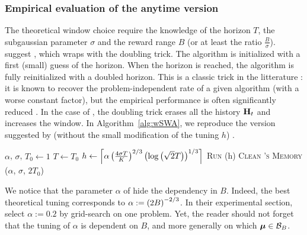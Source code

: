\subsubsection*{Empirical evaluation of the anytime version {\wSWA}}
The theoretical window choice require the knowledge of the horizon $T$, the subgaussian parameter $\sigma$ and the reward range $B$ (or at least the ratio $\frac{B}{\sigma}$). \citet{levine2017rotting} suggest \wSWA, which wraps \SWA  with the doubling trick. The algorithm is initialized with a first (small) guess of the horizon. When the horizon is reached, the algorithm is fully reinitialized with a doubled horizon. This is a classic trick in the litterature : it is known to recover the problem-independent rate of a given algorithm (with a worse constant factor), but the empirical performance is often significantly reduced \citep{besson2018}. In the case of \wSWA, the doubling trick erases all the history $\mathbf{H}_t$ and increases the window. In Algorithm~\ref{alg:wSWA}, we reproduce the version suggested by \citet{levine2017rotting} (without the small modification of the tuning $h$) . 

\begin{minipage}{\textwidth}
\renewcommand*\footnoterule{}
\begin{savenotes}
\begin{algorithm}[H]
\caption{\wSWA \citep{levine2017rotting} }
\label{alg:wSWA}
\begin{algorithmic}[1]
\Require $\alpha$, $\sigma$, $T_0 \gets 1$
\State $T \gets T_0$
\State $h \gets \left\lceil\alpha\left(\frac{4\sigma T}{K}\right)^{2/3}\left(\log\left(\sqrt{2}T\right)\right)^{1/3}\right\rceil$
		\State \textsc{Run} \SWA(h)
	\EndFor
\State \textsc{Clean \SWA's \textsc{Memory}}
\State \wSWA($\alpha$, $\sigma$, $2T_0$) 
\end{algorithmic}
\end{algorithm}
\end{savenotes}
\end{minipage}

We notice that the parameter $\alpha$ of \wSWA hide the dependency in $B$. Indeed, the best theoretical tuning corresponds to $\alpha := \left(2B\right)^{-2/3}$. In their experimental section, \citet{levine2017rotting} select $\alpha:= 0.2$ by grid-search on one problem. Yet, the reader should not forget that the tuning of $\alpha$ is dependent on $B$, and more generally on which ${\boldsymbol \mu} \in \mathcal{B}_{B}$. 




